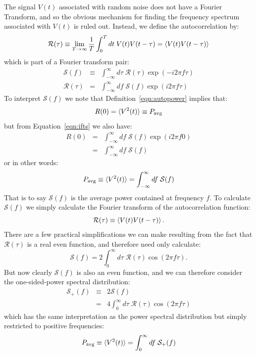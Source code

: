 \documentclass[12pt]{article}
\begin{document}
The signal $V(t)$ associated with random noise does not have a Fourier Transform, and so the obvious mechanism for finding the frequency spectrum associated with $V(t)$ is ruled out.  Instead, we define the autocorrelation by:
\begin{equation}
\mathcal{R}(\tau) \equiv \lim_{T \to \infty } \frac{1}{T} \int_{0}^{T} dt \; V(t) V(t-\tau) = \braket{V(t) V(t-\tau)}
\label{eqn:autopower}
\end{equation}
which is part of a Fourier transform pair:
\begin{eqnarray}
\mathcal{S}(f) &\equiv& \int_{-\infty}^{\infty} d\tau \; \mathcal{R}(\tau) \exp(-i2\pi f \tau) \\ 
\mathcal{R}(\tau) &=& \int_{-\infty}^{\infty} df \; \mathcal{S}(f) \exp(i2\pi f \tau)  \label{eqn:ifts}
\end{eqnarray}
To interpret $\mathcal{S}(f)$ we note that Definition~\ref{eqn:autopower} implies that:
\begin{displaymath}
R(0) = \braket{V^2(t)} \equiv P_{\rm avg}
\end{displaymath}
but from Equation~\ref{eqn:ifts} we also have:
\begin{eqnarray*}
R(0) &=& \int_{-\infty}^{\infty} df \; \mathcal{S}(f) \exp(i2\pi f 0) \\
        &=& \int_{-\infty}^{\infty} df \; \mathcal{S}(f)
\end{eqnarray*}
or in other words:
\begin{displaymath}
P_{\rm avg} \equiv \braket{V^2(t)} = \int_{-\infty}^{\infty} df \; \mathcal{S}(f) 
\end{displaymath}
That is to say $\mathcal{S}(f)$ is the average power contained at frequency $f$.  To calculate $\mathcal{S}(f)$ we simply calculate the Fourier transform of the autocorrelation function:
\begin{equation}
\mathcal{R}(\tau) \equiv \braket{V(t) V(t-\tau)}.
\end{equation}
There are a few practical simplifications we can make resulting from the fact that $\mathcal{R}(\tau)$
is a real even function, and therefore need only calculate:
\begin{displaymath}
\mathcal{S}(f) =2  \int^{\infty}_{0} d\tau \; \mathcal{R}(\tau) \cos(2\pi f \tau).
\end{displaymath}
But now clearly $\mathcal{S}(f)$ is also an even function, and we can therefore consider the one-sided-power spectral distribution:
\begin{eqnarray}
\mathcal{S}_{+}(f) &\equiv& 2 \mathcal{S}(f) \\ 
&=& 4  \int^{\infty}_{0} d\tau \; \mathcal{R}(\tau) \cos(2\pi f \tau) 
\end{eqnarray}
which has the same interpretation as the power spectral distribution but simply restricted to positive frequencies:
\begin{equation}
P_{\rm avg} \equiv \braket{V^2(t)} = \int_{0}^{\infty} df \; \mathcal{S}_+(f) 
\end{equation}
\end{document}
